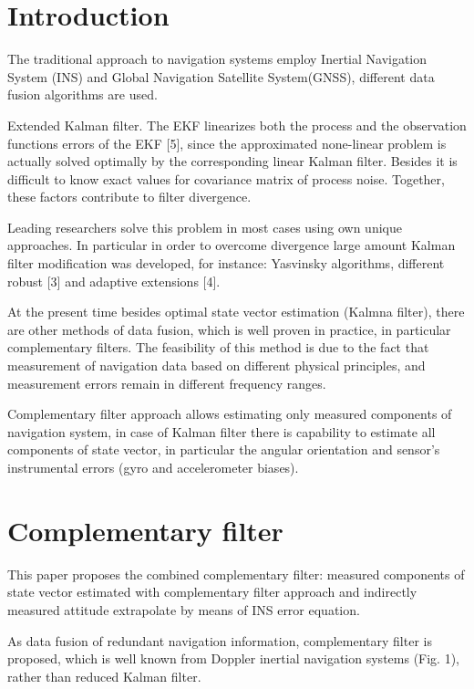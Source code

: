 \documentclass[conference, utf8]{IEEEtran}
\begin{document}
\section{Introduction}
The traditional approach to navigation systems employ Inertial Navigation System (INS) and 
Global Navigation Satellite System(GNSS), different data fusion algorithms are used.

Extended Kalman filter. The EKF linearizes both the process  and the observation functions 
errors of the EKF [5], since the approximated none-linear problem is actually solved 
optimally by the corresponding linear Kalman filter. Besides it is difficult to know exact 
values for covariance matrix of process noise. Together, these factors contribute to filter 
divergence. 

Leading researchers solve this problem in most cases using own unique approaches. In 
particular in order to overcome divergence large amount Kalman filter modification 
was developed, for instance: Yasvinsky algorithms, different robust [3] and adaptive 
extensions [4].  

At the present time besides optimal state vector estimation (Kalmna filter), there are 
other methods of data fusion, which is well proven in practice, in particular 
complementary filters. The feasibility of this method is due to the fact that 
measurement of navigation data based on different physical principles, and 
measurement errors remain in different frequency ranges.

Complementary filter approach allows estimating only measured components of 
navigation system, in case of Kalman filter there is capability to estimate all 
components of state vector, in particular the angular orientation and sensor’s 
instrumental errors (gyro and accelerometer biases).

\section{Complementary filter}
This paper proposes the combined complementary filter: measured components of state 
vector estimated with complementary filter approach and indirectly measured attitude 
extrapolate by means of INS error equation.

As data fusion of redundant navigation information, complementary filter is proposed, 
which is well known from Doppler inertial navigation systems (Fig. 1), rather than 
reduced Kalman filter.
\end{document}
